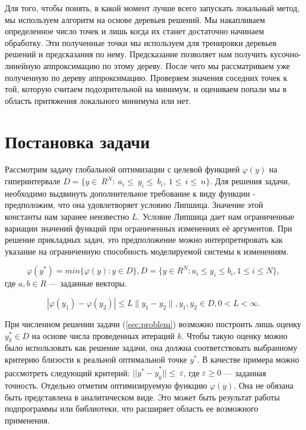 \documentclass[12pt, a4paper, russian]{article}
\begin{document}
Для того, чтобы понять, в какой момент лучше всего запускать локальный метод, мы используем алгоритм на основе деревьев решений. Мы накапливаем определенное число точек и лишь когда их станет достаточно начинаем обработку. Эти полученные точки мы используем для тренировки деревьев решений и предсказания по нему. Предсказание позволяет нам получить кусочно-линейную аппроксимацию по этому дереву. После чего мы рассматриваем уже полученную по дереву аппроксимацию. Проверяем значения соседних точек к той, которую считаем подозрительной на минимум, и оцениваем попали мы в область притяжения локального минимума или нет. 

\section{Постановка задачи}

Рассмотрим задачу глобальной оптимизации с целевой функцией $\varphi(y)$ на гиперинтервале $D=\{ y\in\ R^N:\ a_i\le\ y_i\le\ b_i,\ 1 \le\, i\le\ n \}$. Для решения задачи, необходимо выдвинуть дополнительное требование к виду функции - предположим, что она удовлетворяет условию Липшица. Значение этой константы нам заранее неизвестно $L$. Условие Липшица дает нам  ограниченные вариации значений функций при ограниченных изменениях её аргументов. При решение прикладных задач, это предположение можно интерпретировать как указание на ограниченную способность моделируемой системы к изменениям. 



\begin{equation} \label{sec:problem}   
	\varphi(y^*) = min\{\varphi(y):y\in D\}, D = \{y \in R^N : a_i \leq y_i \leq b_i, 1 \leq i \leq N \},
\end{equation}
где $a,b \in R$ --- заданные векторы.


\begin{displaymath}
	|\varphi(y_1)-\varphi(y_2)|\leq L\parallel y_1-y_2 \parallel
	,y_1,y_2 \in D, 0<L< \infty.
\end{displaymath}




При численном решении задачи (\ref{sec:problem}) возможно построить лишь оценку $y_k^\ast\in D$ на основе числа проведенных итераций $k$. Чтобы такую оценку можно было использовать как решение задачи, она должна соответствовать выбранному критерию близости к реальной оптимальной точке $y^\ast$. В качестве примера можно рассмотреть следующий критерий: ${ ||y^\ast -y}_k^\ast||\le\ \varepsilon$, где $\varepsilon\geq0$ — заданная точность. Отдельно отметим оптимизируемую функцию $\varphi(y)$. Она не обязана быть представлена в аналитическом виде. Это может быть результат работы подпрограммы или библиотеки, что расширяет область ее возможного применения.
\end{document}

